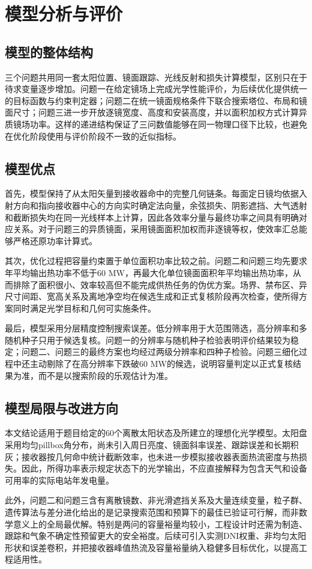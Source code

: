 \section{模型分析与评价}

\subsection{模型的整体结构}

三个问题共用同一套太阳位置、镜面跟踪、光线反射和损失计算模型，区别只在于待求变量逐步增加。问题一在给定镜场上完成光学性能评价，为后续优化提供统一的目标函数与约束判定器；问题二在统一镜面规格条件下联合搜索塔位、布局和镜面尺寸；问题三进一步开放逐镜宽度、高度和安装高度，并以面积加权方式计算异质镜场功率。这样的递进结构保证了三问数值能够在同一物理口径下比较，也避免在优化阶段使用与评价阶段不一致的近似指标。

\subsection{模型优点}

首先，模型保持了从太阳矢量到接收器命中的完整几何链条。每面定日镜均依据入射方向和指向接收器中心的方向实时确定法向量，余弦损失、阴影遮挡、大气透射和截断损失均在同一光线样本上计算，因此各效率分量与最终功率之间具有明确对应关系。对于问题三的异质镜面，采用镜面面积加权而非逐镜等权，使效率汇总能够严格还原功率计算式。

其次，优化过程把容量约束置于单位面积功率比较之前。问题二和问题三均先要求年平均输出热功率不低于60 MW，再最大化单位镜面面积年平均输出热功率，从而排除了面积很小、效率较高但不能完成供热任务的伪优方案。场界、禁布区、异尺寸间距、宽高关系及离地净空均在候选生成和正式复核阶段再次检查，使所得方案同时满足光学目标和几何可实施条件。

最后，模型采用分层精度控制搜索误差。低分辨率用于大范围筛选，高分辨率和多随机种子只用于候选复核。问题一的分辨率与随机种子检验表明评价结果较为稳定；问题二、问题三的最终方案也均经过两级分辨率和四种子检验。问题三细化过程中还主动剔除了在高分辨率下跌破60 MW的候选，说明容量判定以正式复核结果为准，而不是以搜索阶段的乐观估计为准。

\subsection{模型局限与改进方向}

本文结论适用于题目给定的60个离散太阳状态及所建立的理想化光学模型。太阳盘采用均匀pillbox角分布，尚未引入周日亮度、镜面斜率误差、跟踪误差和长期积灰；接收器按几何命中统计截断效率，也未进一步模拟接收器表面热流密度与热损失。因此，所得功率表示规定状态下的光学输出，不应直接解释为包含天气和设备可用率的实际电站年发电量。

此外，问题二和问题三含有离散镜数、非光滑遮挡关系及大量连续变量，粒子群、遗传算法与差分进化给出的是记录搜索范围和预算下的最佳已验证可行解，而非数学意义上的全局最优解。特别是两问的容量裕量均较小，工程设计时还需为制造、跟踪和气象不确定性预留更大的安全裕度。后续可引入实测DNI权重、非均匀太阳形状和误差卷积，并把接收器峰值热流及容量裕量纳入稳健多目标优化，以提高工程适用性。
